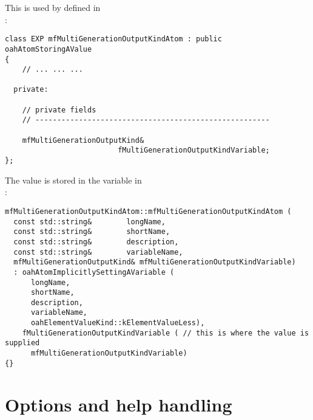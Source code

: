 This is used by  defined in \\
:
\begin{lstlisting}[language=CPlusPlus]
class EXP mfMultiGenerationOutputKindAtom : public oahAtomStoringAValue
{
	// ... ... ...

  private:

    // private fields
    // ------------------------------------------------------

    mfMultiGenerationOutputKind&
                          fMultiGenerationOutputKindVariable;
};
\end{lstlisting}

The value is stored in the variable in \\
:
\begin{lstlisting}[language=CPlusPlus]
mfMultiGenerationOutputKindAtom::mfMultiGenerationOutputKindAtom (
  const std::string&        longName,
  const std::string&        shortName,
  const std::string&        description,
  const std::string&        variableName,
  mfMultiGenerationOutputKind& mfMultiGenerationOutputKindVariable)
  : oahAtomImplicitlySettingAVariable (
      longName,
      shortName,
      description,
      variableName,
      oahElementValueKind::kElementValueLess),
    fMultiGenerationOutputKindVariable ( // this is where the value is supplied
      mfMultiGenerationOutputKindVariable)
{}
\end{lstlisting}


\section{Options and help handling}

